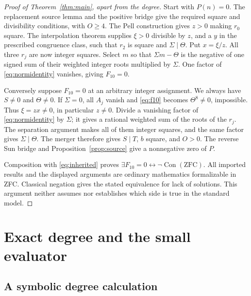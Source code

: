 \documentclass[11pt,letterpaper]{article}
\newcommand{\Con}{\operatorname{Con}}
\newcommand{\ZFC}{\mathrm{ZFC}}
\theoremstyle{remark}
\begin{document}
\begin{proof}[Proof of Theorem~\ref{thm:main}, apart from the degree]
Start with \(P(n)=0\). The replacement source lemma and the positive
bridge give the required square and divisibility conditions, with
\(O\ge4\). The Pell construction gives \(z>0\) making \(r_0\) square.
The interpolation theorem supplies \(\xi>0\) divisible by \(z\),
and a \(y\) in the prescribed congruence class, such that \(r_2\) is
square and \(\Sigma\mid\Theta\). Put \(x=\xi/z\).
All three \(r_j\) are now integer squares. Select \(m\) so that
\(\Sigma m-\Theta\) is the negative of one signed sum of their
weighted integer roots multiplied by \(\Sigma\).
One factor of \eqref{eq:normidentity} vanishes, giving \(F_{10}=0\).

Conversely suppose \(F_{10}=0\) at an arbitrary integer assignment.
We always have \(S\ne0\) and \(\Theta\ne0\).
If \(\Sigma=0\), all \(A_j\) vanish and \eqref{eq:f10} becomes
\(\Theta^8\ne0\), impossible. Thus \(\xi=zx\ne0\), in particular
\(z\ne0\). Divide a vanishing factor of \eqref{eq:normidentity}
by \(\Sigma\); it gives a rational weighted sum of the roots of
the \(r_j\). The separation argument makes all of them integer
squares, and the same factor gives \(\Sigma\mid\Theta\).
The merger therefore gives \(S\mid T\), \(b\) square, and \(O>0\).
The reverse Sun bridge and Proposition~\ref{prop:source} give a
nonnegative zero of \(P\).

Composition with \eqref{eq:inherited} proves
\(\exists F_{10}=0\leftrightarrow\neg\Con(\ZFC)\).
All imported results and the displayed arguments are ordinary
mathematics formalizable in ZFC. Classical negation gives the
stated equivalence for lack of solutions. This argument neither
assumes nor establishes which side is true in the standard model.
\end{proof}

\section{Exact degree and the small evaluator}
\label{sec:degree}

\subsection{A symbolic degree calculation}
\end{document}
